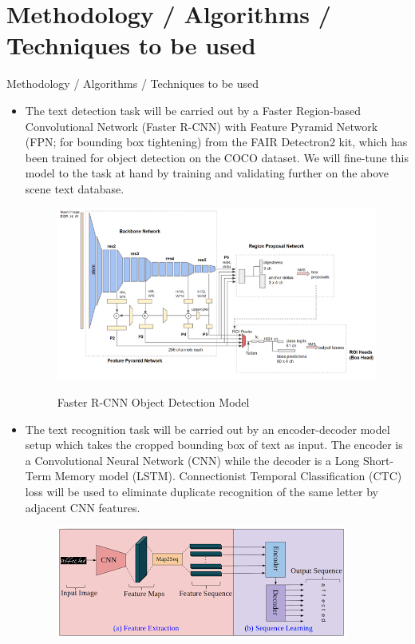 \documentclass{beamer}
\begin{document}
\section{Methodology / Algorithms / Techniques to be used}
\begin{frame}[allowframebreaks]{Methodology / Algorithms / Techniques to be used}
\begin{itemize}
	\item The text detection task will be carried out by a Faster Region-based Convolutional Network (Faster R-CNN) with Feature Pyramid Network (FPN; for bounding box tightening) from the FAIR Detectron2 kit, which has been trained for object detection on the COCO dataset. We will fine-tune this model to the task at hand by training and validating further on the above scene text database.
	\begin{figure}
			{\includegraphics[scale=.4]{Text_Detection_Model}}
			\caption{Faster R-CNN Object Detection Model}
			\label{Text_Detection_Model}
	\end{figure}
	\framebreak
	\item The text recognition task will be carried out by an encoder-decoder model setup which takes the cropped bounding box of text as input. The encoder is a Convolutional Neural Network (CNN) while the decoder is a Long Short-Term Memory model (LSTM). Connectionist Temporal Classification (CTC) loss will be used to eliminate duplicate recognition of the same letter by adjacent CNN features.
	\begin{figure}
			{\includegraphics[scale=.6]{Text_Recognition_Model}}

\end{figure}
\end{itemize}
\end{frame}
\end{document}
